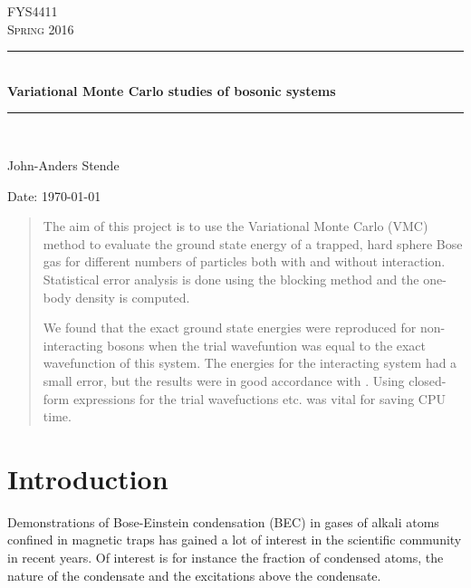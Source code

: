 \documentclass[english, a4paper]{article}
\begin{document}
\renewcommand{\figurename}{Figure}
\begin{titlepage}
\begin{center}

\textsc{\Large FYS4411}\\[0.5cm]
\textsc{\Large Spring 2016}\\[1.5cm]
\rule{\linewidth}{0.5mm} \\[0.4cm]
{ \huge \bfseries Variational Monte Carlo studies of bosonic systems}\\[0.10cm]
\rule{\linewidth}{0.5mm} \\[1.5cm]

\begin{minipage}{0.49\textwidth}
    \begin{center} \large
        John-Anders Stende \\[0.8cm]
    \end{center}
\end{minipage}


\vfill

\large{Date: \today}

\end{center}
\end{titlepage}


\begin{abstract}
The aim of this project is to use the Variational Monte Carlo (VMC) method to evaluate the 
ground state energy of a trapped, hard sphere Bose gas for different numbers of particles
both with and without interaction. Statistical error analysis is done using the blocking method 
and the one-body density is computed. 

We found that the exact ground state energies were reproduced for non-interacting bosons
when the trial wavefuntion was equal to the exact wavefunction of this system.
The energies for the interacting system had a small error, but the results were in good
accordance with \cite{ref1}. Using closed-form expressions for the trial wavefuctions etc. was vital 
for saving CPU time. 


\end{abstract}

\tableofcontents


\section{Introduction}
Demonstrations of Bose-Einstein condensation (BEC) in gases of alkali atoms confined in magnetic traps has gained
a lot of interest in the scientific community in recent years. Of interest is for instance the fraction of condensed atoms, 
the nature of the condensate and the excitations above the condensate. \\
\end{document}
